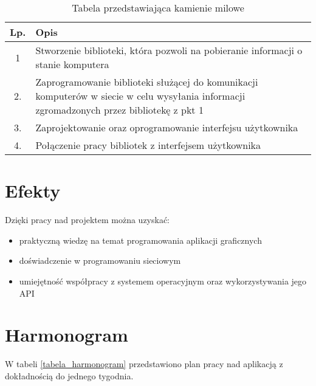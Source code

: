 \documentclass[a4paper]{article}
\begin{document}
		\begin{table}[h]
			\centering
			\begin{tabularx}{0.65\textwidth}{|c|X|}
				\hline
				Lp. & Opis \\ \hline
				1 & Stworzenie biblioteki, która pozwoli na pobieranie informacji o stanie komputera \\ \hline
				2. & Zaprogramowanie biblioteki służącej do komunikacji komputerów w siecie w celu wysyłania informacji zgromadzonych przez bibliotekę z pkt 1 \\ \hline
				3. & Zaprojektowanie oraz oprogramowanie interfejsu użytkownika \\ \hline
				4. & Połączenie pracy bibliotek z interfejsem użytkownika \\ \hline
			\end{tabularx}
			\caption{Tabela przedstawiająca kamienie milowe}
		\end{table}
		
			\section{Efekty}
			Dzięki pracy nad projektem można uzyskać:
			\begin{itemize}
				\item praktyczną wiedzę na temat programowania aplikacji graficznych
				\item doświadczenie w programowaniu sieciowym
				\item umiejętność współpracy z systemem operacyjnym oraz wykorzystywania jego API 
			\end{itemize}
		
		\section{Harmonogram}
		
		W tabeli \ref{tabela_harmonogram} przedstawiono plan pracy nad aplikacją z dokładnością do jednego tygodnia.
		
\end{document}
